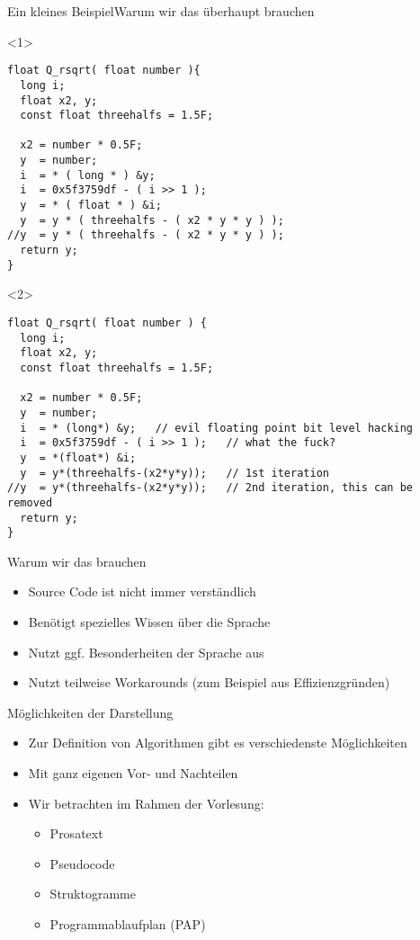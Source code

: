 \begin{frame}[fragile]{Ein kleines Beispiel}{Warum wir das überhaupt brauchen}
\lstset{style=cpp}
\begin{onlyenv}<1>
\begin{lstlisting}
float Q_rsqrt( float number ){
  long i;
  float x2, y;
  const float threehalfs = 1.5F;

  x2 = number * 0.5F;
  y  = number;
  i  = * ( long * ) &y;                       
  i  = 0x5f3759df - ( i >> 1 );                
  y  = * ( float * ) &i;
  y  = y * ( threehalfs - ( x2 * y * y ) );   
//y  = y * ( threehalfs - ( x2 * y * y ) );   
  return y;
}
\end{lstlisting}
\end{onlyenv}
\begin{onlyenv}<2>
\begin{lstlisting}
float Q_rsqrt( float number ) {
  long i;
  float x2, y;
  const float threehalfs = 1.5F;

  x2 = number * 0.5F;
  y  = number;
  i  = * (long*) &y;   // evil floating point bit level hacking
  i  = 0x5f3759df - ( i >> 1 );   // what the fuck?
  y  = *(float*) &i;
  y  = y*(threehalfs-(x2*y*y));   // 1st iteration
//y  = y*(threehalfs-(x2*y*y));   // 2nd iteration, this can be removed
  return y;
}
\end{lstlisting}
\end{onlyenv}
\end{frame}

\begin{frame}{Warum wir das brauchen}
    \begin{itemize}[<+->]
        \item Source Code ist nicht immer verständlich
        \item Benötigt spezielles Wissen über die Sprache
        \item Nutzt ggf. Besonderheiten der Sprache aus
        \item Nutzt teilweise Workarounds (zum Beispiel aus Effizienzgründen)
    \end{itemize}
\end{frame}

\begin{frame}{Möglichkeiten der Darstellung}{}
    \begin{itemize}[<+->]
        \item Zur Definition von Algorithmen gibt es verschiedenste Möglichkeiten
        \item Mit ganz eigenen Vor- und Nachteilen
        \item Wir betrachten im Rahmen der Vorlesung:
        \begin{itemize}
            \item Prosatext
            \item Pseudocode
            \item Struktogramme
            \item Programmablaufplan (PAP)
        \end{itemize}
    \end{itemize}
\end{frame}

